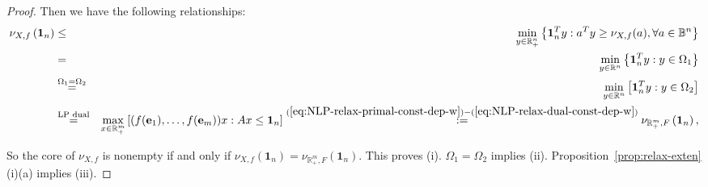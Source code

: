 \documentclass[11pt]{article}\usepackage[]{graphicx}\usepackage[]{xcolor}
\begin{document}
\begin{proof}
Then we have the following relationships:  
\begin{eqnarray*}
\nonumber \nu_{X, f}\left(\mathbf{1}_n\right)&\le &\min\limits_{y\in\mathbb{R}^{n}_{+}}\left\{\mathbf{1}_n^Ty: a^Ty\ge \nu_{X, f}(a), \forall a\in\mathbb{B}^n\right\}\\
\nonumber&=&\min\limits_{y\in\mathbb{R}^{n}}\left\{\mathbf{1}_n^Ty: y\in \Omega_1\right\}\\
&\overset{\Omega_1=\Omega_2}{=}&\min\limits_{y\in\mathbb{R}^{n}} \left[\mathbf{1}_n^Ty: y\in \Omega_2\right]\\
\nonumber&\overset{\text{LP dual}}{=}&\max\limits_{x\in \mathbb{R}^m_{+}} \left[(f(\mathbf{e}_1),\dots, f(\mathbf{e}_m))x: Ax\le \mathbf{1}_n\right]\overset{(\ref{eq:NLP-relax-primal-const-dep-w})-(\ref{eq:NLP-relax-dual-const-dep-w})}{:=}\nu_{\mathbb{R}^m_{+}, F}\left(\mathbf{1}_n\right),
\end{eqnarray*}

So the core of $\nu_{X, f}$ is nonempty if and only if $\nu_{X, f}\left(\mathbf{1}_n\right)=\nu_{\mathbb{R}^m_{+}, F}\left(\mathbf{1}_n\right)$. This proves (i).  $\Omega_1=\Omega_2$ implies (ii). Proposition~\ref{prop:relax-exten}(i)(a) implies (iii).  

\end{proof}
\end{document}
